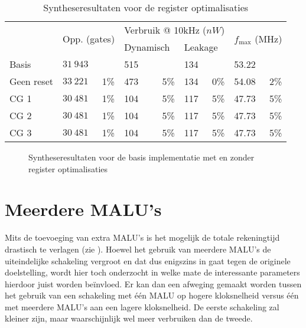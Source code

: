 \begin{table}[h]
	\caption{Syntheseresultaten voor de register optimalisaties}
	\label{tabel-resultaten-optimalisaties}

	\centering
	\begin{tabular}{|l|lr|lr|lr|lr|}
		\hline
		& \multicolumn{2}{l|}{\multirow{2}{*}{Opp. (gates)}}	& \multicolumn{4}{c|}{Verbruik @ 10kHz ($nW$)}	& \multicolumn{2}{l|}{\multirow{2}{*}{$f_{\text{max}}$ (MHz)}}\\
		\cline{4-7}
		&	& & \multicolumn{2}{l|}{Dynamisch}	& \multicolumn{2}{l|}{Leakage}	& &\\
		\hline \hline
		Basis			& $31\:943$	& & 515	& 	& 134 & 	& 53.22 & \\
		\hline
		Geen reset	& $33\:221$	& 1\%	& 473	& 5\%	& 134 & 0\%	& 54.08	& 2\%\\
		CG 1			& $30\:481$	& 1\%	& 104	& 5\%	& 117	& 5\%	& 47.73	& 5\%\\
		CG 2			& $30\:481$	& 1\%	& 104	& 5\%	& 117	& 5\%	& 47.73	& 5\%\\
		CG 3			& $30\:481$	& 1\%	& 104	& 5\%	& 117	& 5\%	& 47.73	& 5\%\\
		\hline		
	\end{tabular}
\end{table}

\begin{figure}[h]
	\centering
		\caption{Syntheseresultaten voor de basis implementatie met en zonder register optimalisaties\label{figuur-resultaten-m1}}
\end{figure}

\section{Meerdere MALU's\label{sectie-resulaten-malus}}

Mits de toevoeging van extra MALU's is het mogelijk de totale rekeningtijd drastisch te verlagen (zie ). Hoewel het gebruik van meerdere MALU's de uiteindelijke schakeling vergroot en dat dus enigszins in gaat tegen de originele doelstelling, wordt hier toch onderzocht in welke mate de interessante parameters hierdoor juist worden be\"invloed. Er kan dan een afweging gemaakt worden tussen het gebruik van een schakeling met \'e\'en MALU op hogere kloksnelheid versus \'e\'en met meerdere MALU's aan een lagere kloksnelheid. De eerste schakeling zal kleiner zijn, maar waarschijnlijk wel meer verbruiken dan de tweede.

